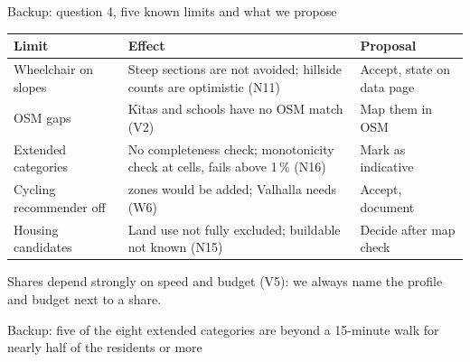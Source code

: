 \documentclass[aspectratio=169,10pt]{beamer}
\begin{document}
\begin{frame}{Backup: question 4, five known limits and what we propose}
  \footnotesize
  \begin{tabular}{@{}P{32mm}P{62mm}P{34mm}@{}}
    \toprule
    Limit & Effect & Proposal \\
    \midrule
    Wheelchair on slopes & Steep sections are not avoided; hillside counts are optimistic (N11)
      & Accept, state on data page \\
    OSM gaps & \factVTwoKitaMissing{} Kitas and \factVTwoSchoolMissing{} schools have no OSM
      match (V2) & Map them in OSM \\
    Extended categories & No completeness check; monotonicity check at \factCurMonoCells{} cells,
      fails above 1\,\% (N16) & Mark as indicative \\
    Cycling recommender off & \factCyclingZones{} zones would be added; Valhalla needs
      \factCyclingValhallaPeak{} (W6) & Accept, document \\
    Housing candidates & Land use not fully excluded; buildable not known (N15) & Decide after
      map check \\
    \bottomrule
  \end{tabular}
  \par\medskip
  {\footnotesize\color{muted}Shares depend strongly on speed and budget (V5): we always name the
  profile and budget next to a share.}
\end{frame}

\begin{frame}{Backup: five of the eight extended categories are beyond a 15-minute walk for
  nearly half of the residents or more}
  \centering
\end{frame}
\end{document}
